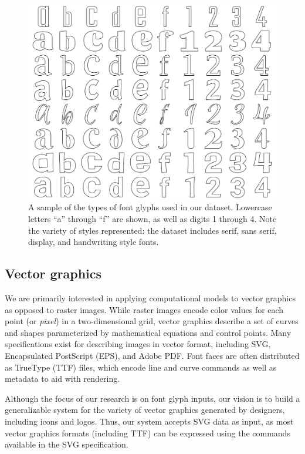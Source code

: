 \begin{figure}[t]
	\includegraphics[width=\textwidth]{figures/input_fonts}
    \caption[A sample of the types of font faces used in our fonts dataset]{A sample of the types of font glyphs used in our dataset. Lowercase letters ``a'' through ``f'' are shown, as well as digits 1 through 4. Note the variety of styles represented: the dataset includes serif, sans serif, display, and handwriting style fonts.\label{fig:input_fonts}}
\end{figure}

\subsection{Vector graphics}
We are primarily interested in applying computational models to vector graphics as opposed to raster images.
While raster images encode color values for each point (or \textit{pixel}) in a two-dimensional grid, vector graphics describe a set of curves and shapes parameterized by mathematical equations and control points.
Many specifications exist for describing images in vector format, including SVG, Encapsulated PostScript (EPS), and Adobe PDF\@.
Font faces are often distributed as TrueType (TTF) files, which encode line and curve commands as well as metadata to aid with rendering.

Although the focus of our research is on font glyph inputs, our vision is to build a generalizable system for the variety of vector graphics generated by designers, including icons and logos.
Thus, our system accepts SVG data as input, as most vector graphics formats (including TTF) can be expressed using the commands available in the SVG specification.

